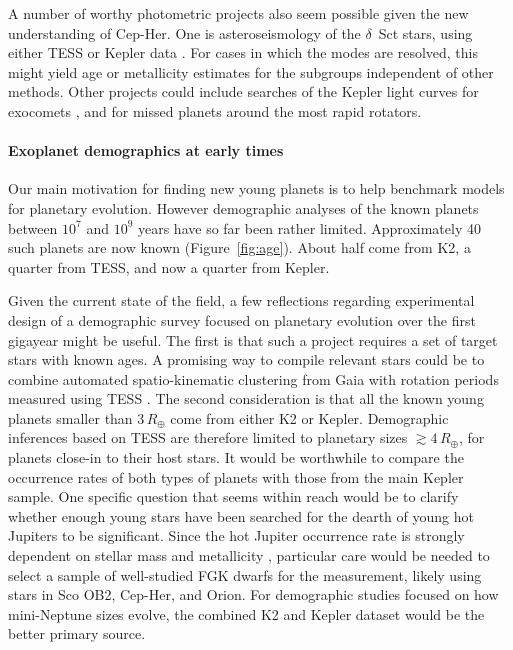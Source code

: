 \documentclass[12pt,twocolumn]{aastex63}
\begin{document}
A number of worthy photometric projects also seem possible given the
new understanding of Cep-Her.  One is asteroseismology of the
$\delta$~Sct stars, using either TESS or Kepler data
\citep{bedding_very_2020}.  For cases in which the modes are resolved,
this might yield age or metallicity estimates for the subgroups
independent of other methods.  Other projects could include
searches of the Kepler light curves for exocomets
\citep{zieba_transiting_2019}, and for missed planets around the most
rapid rotators.

\paragraph{Exoplanet demographics at early times}
Our main motivation for finding new young planets is to help benchmark
models for planetary evolution.  However demographic analyses of the
known planets between $10^7$ and $10^9$ years have so far been
rather limited.  Approximately 40 such planets are now known
(Figure~\ref{fig:age}).  About half come from K2, a quarter from TESS,
and now a quarter from Kepler.

Given the current state of the field, a few reflections regarding
experimental design of a demographic survey focused on planetary
evolution over the first gigayear might be useful.  The first is
that such a project requires a set of target stars with known ages.
A promising way to compile relevant stars could be to
combine automated spatio-kinematic clustering from Gaia with
rotation periods measured using TESS \citep[see the appendices
of][]{bouma_kep1627_2022}.  The second consideration is that all the known
young planets smaller than $3$\,$R_\oplus$ come from either K2 or
Kepler.  Demographic inferences based on TESS are therefore limited to
planetary sizes $\gtrsim4$\,$R_\oplus$, for planets close-in to their
host stars.  It would be worthwhile to compare the occurrence
rates of both types of planets with those from the main Kepler sample.  One specific
question that seems within reach would be to clarify whether enough
young stars have been searched for the dearth of young hot Jupiters to
be significant.  Since the hot Jupiter occurrence rate is strongly
dependent on stellar mass and metallicity
\citep{petigura_metallicity_2018,petigura_cksX_2022}, particular care
would be needed to select a sample of well-studied FGK dwarfs for the
measurement, likely using stars in Sco OB2, Cep-Her, and Orion.  For
demographic studies focused on how mini-Neptune sizes evolve, the
combined K2 and Kepler dataset would be the better primary source.  
\end{document}
